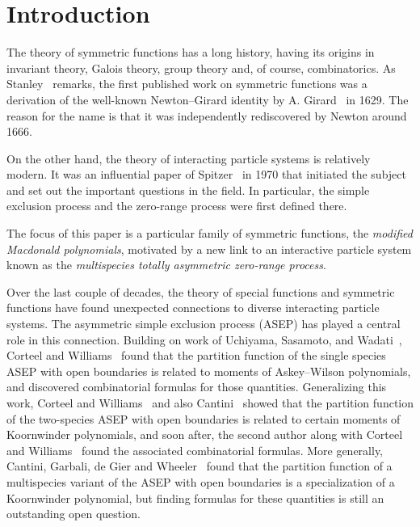 \documentclass[ALCO,Unicode]{cedram}
\begin{document}
\maketitle




\section{Introduction}


The theory of symmetric functions has a long history, having its origins in invariant theory, Galois theory, group theory and, of course, combinatorics. As Stanley~\cite[Notes in Chapter~7]{stanley-ec2} remarks, the first published work on symmetric functions was a derivation of the well-known Newton--Girard identity by A. Girard~\cite{girard-1884} in 1629. The reason for the name is that it was independently rediscovered by Newton around 1666. 

On the other hand, the theory of interacting particle systems is relatively modern. It was an influential paper of Spitzer~\cite{spitzer-1970} in 1970 that initiated the subject and set out the important questions in the field. In particular, the simple exclusion process and the zero-range process were first defined there. 

The focus of this paper is a particular family of symmetric functions, 
the \emph{modified Macdonald polynomials}, motivated by a new link 
to an interactive particle system known as the \emph{multispecies totally
asymmetric zero-range process}. 

Over the last couple of decades, the theory of special functions and symmetric functions have found unexpected connections to diverse interacting particle systems. The asymmetric simple exclusion process  (ASEP) has played a central role in this connection. Building on work of Uchiyama, Sasamoto, and Wadati~\cite{USW,sasamoto-1999}, Corteel and Williams~\cite{CW11} found that the partition function of the single species ASEP with open boundaries is related to moments of Askey--Wilson polynomials, and discovered combinatorial formulas for those quantities. Generalizing this work, Corteel and Williams~\cite{CW18} and also Cantini~\cite{cantini-2017} showed that the partition function of the two-species ASEP with open boundaries is related to certain moments of Koornwinder polynomials, and soon after, the second author along with Corteel and Williams~\cite{CMW-2017} found the associated combinatorial formulas. More generally, Cantini, Garbali, de Gier and Wheeler~\cite{cantini-etal-2016} found that the partition function of a multispecies variant of the ASEP with open boundaries is a specialization of a Koornwinder polynomial, but finding formulas for these quantities is still an outstanding open question.
\end{document}
